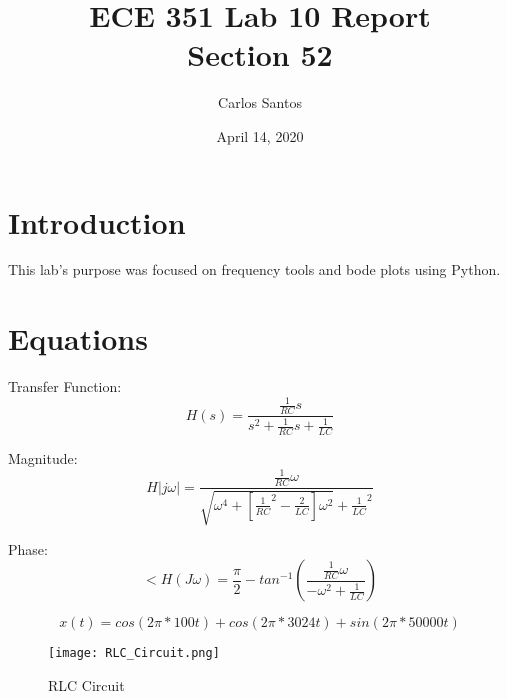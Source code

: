 \documentclass[12pt]{article}
\title{ECE 351 Lab 10 Report \\ Section 52}
\date{April 14, 2020}
\author{Carlos Santos}
\begin{document}
\vspace{\fill}
\maketitle
\vspace{\fill}
\clearpage

\maketitle
\tableofcontents


\section{Introduction}
This lab's purpose was focused on frequency tools and bode plots using Python.
\section{Equations}

Transfer Function:
\begin{equation}
    H(s) = \frac{\frac{1}{RC}s}{s^2+\frac{1}{RC}s+\frac{1}{LC}}
\end{equation}

Magnitude:
\begin{equation}
    H|j\omega| = \frac{\frac{1}{RC}\omega}{\sqrt{\omega ^ 4 + [\frac{1}{RC}^2 - \frac{2}{LC}]\omega ^ 2}+\frac{1}{LC}^2}
\end{equation}

Phase:
\begin{equation}
    <H(J\omega) = \frac{\pi}{2} - tan^{-1}(\frac{\frac{1}{RC}\omega}{-\omega ^ 2 + \frac{1}{LC}})
\end{equation}

\begin{equation}
    x(t) = cos(2\pi*100t) + cos(2\pi*3024t) + sin(2\pi * 50000t)
\end{equation}

\begin{figure}[H]
\caption{RLC Circuit}
\centering
\texttt{[image: RLC\_Circuit.png]}
\end{figure}


\end{document}
